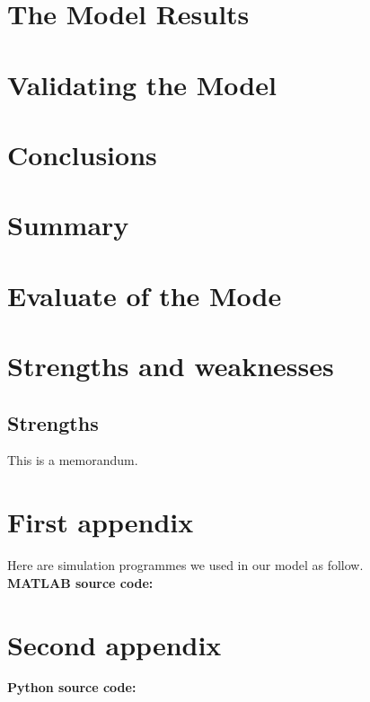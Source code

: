 \documentclass{mcmthesis}  %
\begin{document}
\section{The Model Results}  %

\section{Validating the Model}  %

\section{Conclusions}  %

\section{Summary}  %

\section{Evaluate of the Mode}  %

\section{Strengths and weaknesses}  %

\subsection{Strengths}  %

\printbibliography  %


\begin{appendices}  %

\begin{memo}[Memorandum]  %
	This is a memorandum.
\end{memo}  %

\section{First appendix}  %

Here are simulation programmes we used in our model as follow.\\
\textbf{MATLAB source code:}


\section{Second appendix}  %

\textbf{Python source code:}


\end{appendices}  %
\end{document}
